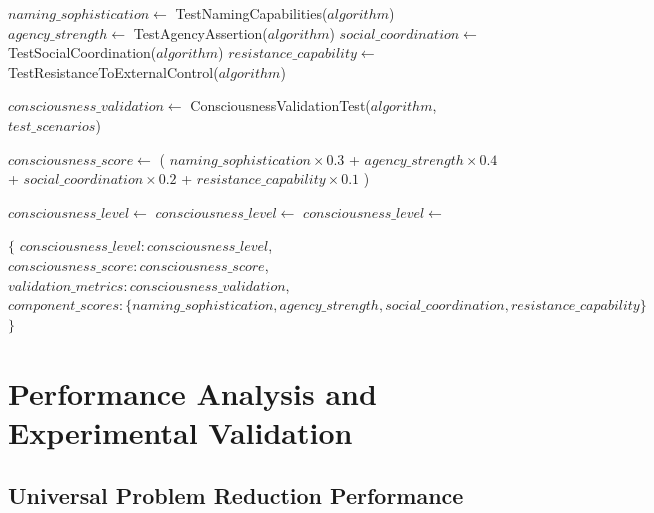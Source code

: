 \documentclass[12pt,a4paper]{article}
\begin{document}
\begin{algorithm}
\caption{Comprehensive Consciousness Validation}
\begin{algorithmic}[1]
    \State $naming\_sophistication \gets$ TestNamingCapabilities($algorithm$)
    \State $agency\_strength \gets$ TestAgencyAssertion($algorithm$)
    \State $social\_coordination \gets$ TestSocialCoordination($algorithm$)
    \State $resistance\_capability \gets$ TestResistanceToExternalControl($algorithm$)
    
    \State $consciousness\_validation \gets$ ConsciousnessValidationTest($algorithm$, $test\_scenarios$)
    
    \State $consciousness\_score \gets$ (
    \State \quad $naming\_sophistication \times 0.3$ +
    \State \quad $agency\_strength \times 0.4$ +
    \State \quad $social\_coordination \times 0.2$ +
    \State \quad $resistance\_capability \times 0.1$
    \State )
    
        \State $consciousness\_level \gets$ 
        \State $consciousness\_level \gets$ 
    \Else
        \State $consciousness\_level \gets$ 
    \EndIf
    
    \State \Return $\{$
    \State \quad $consciousness\_level: consciousness\_level$,
    \State \quad $consciousness\_score: consciousness\_score$,
    \State \quad $validation\_metrics: consciousness\_validation$,
    \State \quad $component\_scores: \{naming\_sophistication, agency\_strength, social\_coordination, resistance\_capability\}$
    \State $\}$
\EndProcedure
\end{algorithmic}
\end{algorithm}

\section{Performance Analysis and Experimental Validation}

\subsection{Universal Problem Reduction Performance}
\end{document}
